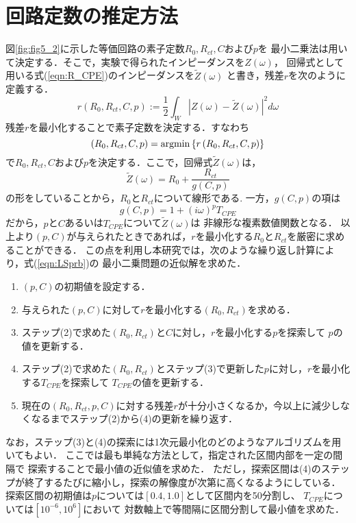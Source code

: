 \section{回路定数の推定方法}
図\ref{fig:fig5_2}に示した等価回路の素子定数$R_0,R_{ct},C$および$p$を
最小二乗法は用いて決定する．そこで，実験で得られたインピーダンスを$Z(\omega)$，
回帰式として用いる式(\ref{eqn:R_CPE})のインピーダンスを$\tilde{Z}(\omega)$
と書き，残差$r$を次のように定義する．
\begin{equation}
	r\left(R_0,R_{ct},C,p \right):= \frac{1}{2}\int _{W} \left| Z(\omega)-\tilde{Z}(\omega)\right|^2 d\omega
	\label{eqn:}
\end{equation}
残差$r$を最小化することで素子定数を決定する．すなわち
\begin{equation}
	\left( R_0, R_{ct}, C,p \right)= {\rm argmin} \left\{ r\left(R_0,R_{ct},C,p \right) \right\}
	\label{eqn:LSprb}
\end{equation}
で$R_0,R_{ct},C$および$p$を決定する．ここで，回帰式$\tilde Z(\omega)$は，
\begin{equation}
	\tilde Z (\omega) =R_0+\frac{R_{ct}}{g(C,p)}
	\label{eqn:}
\end{equation}
の形をしていることから，$R_0$と$R_{ct}$について線形である. 一方，$g(C,p)$の項は
\begin{equation}
	g(C,p)= 1+(i\omega)^pT_{CPE} 
	\label{eqn:}
\end{equation}
だから，$p$と$C$あるいは$T_{CPE}$について$\tilde {Z}(\omega)$は
非線形な複素数値関数となる．
以上より$(p,C)$が与えられたときであれば，$r$を最小化する$R_0$と$R_{ct}$を厳密に求めることができる．
この点を利用し本研究では，次のような繰り返し計算により，式(\ref{eqn:LSprb})の
最小二乗問題の近似解を求めた．
\begin{enumerate}
\item
	$(p,C)$の初期値を設定する．
\item
	与えられた$(p,C)$に対して$r$を最小化する$(R_0, R_{ct})$を求める．
\item
	ステップ(2)で求めた$(R_0,R_{ct})$と$C$に対し，$r$を最小化する$p$を探索して
	$p$の値を更新する．
\item
	ステップ(2)で求めた$(R_0,R_{ct})$とステップ(3)で更新した$p$に対し，$r$を最小化する$T_{CPE}$を探索して
	$T_{CPE}$の値を更新する．
\item
	現在の$(R_0,R_{ct},p,C)$に対する残差$r$が十分小さくなるか，今以上に減少しなくなるまでステップ(2)から(4)の更新を繰り返す．
\end{enumerate}
なお，ステップ(3)と(4)の探索には1次元最小化のどのようなアルゴリズムを用いてもよい．
ここでは最も単純な方法として，指定された区間内部を一定の間隔で
探索することで最小値の近似値を求めた．
ただし，探索区間は(4)のステップが終了するたびに縮小し，探索の解像度が次第に高くなるようにしている．
探索区間の初期値は$p$については$[0.4,1.0]$として区間内を50分割し、
$T_{CPE}$については$ [10^{-6}, 10^{6}]$において
対数軸上で等間隔に区間分割して最小値を求めた．
